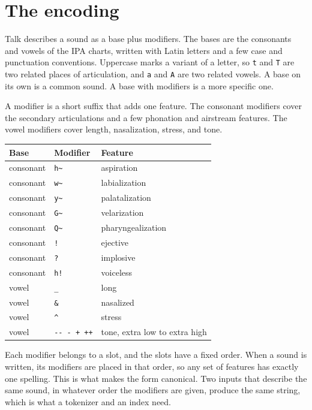 \section{The encoding}

Talk describes a sound as a base plus modifiers. The bases are the consonants and vowels of the IPA charts, written with Latin letters and a few case and punctuation conventions. Uppercase marks a variant of a letter, so \verb|t| and \verb|T| are two related places of articulation, and \verb|a| and \verb|A| are two related vowels. A base on its own is a common sound. A base with modifiers is a more specific one.

A modifier is a short suffix that adds one feature. The consonant modifiers cover the secondary articulations and a few phonation and airstream features. The vowel modifiers cover length, nasalization, stress, and tone.

\begin{center}
\begin{tabular}{lll}
\toprule
Base & Modifier & Feature \\
\midrule
consonant & \verb|h~| & aspiration \\
consonant & \verb|w~| & labialization \\
consonant & \verb|y~| & palatalization \\
consonant & \verb|G~| & velarization \\
consonant & \verb|Q~| & pharyngealization \\
consonant & \verb|!|  & ejective \\
consonant & \verb|?|  & implosive \\
consonant & \verb|h!| & voiceless \\
vowel     & \verb|_|  & long \\
vowel     & \verb|&|  & nasalized \\
vowel     & \verb|^|  & stress \\
vowel     & \verb|-- - + ++| & tone, extra low to extra high \\
\bottomrule
\end{tabular}
\end{center}

Each modifier belongs to a slot, and the slots have a fixed order. When a sound is written, its modifiers are placed in that order, so any set of features has exactly one spelling. This is what makes the form canonical. Two inputs that describe the same sound, in whatever order the modifiers are given, produce the same string, which is what a tokenizer and an index need.

